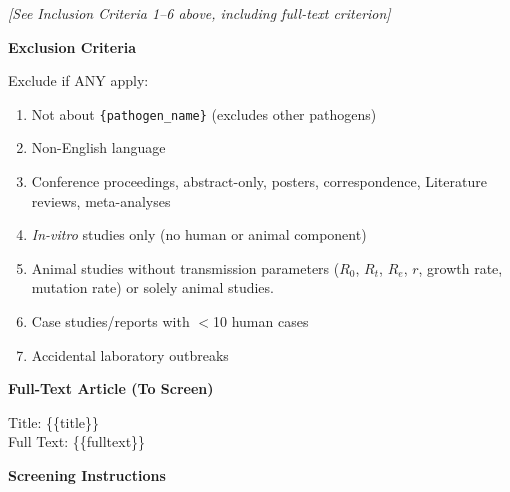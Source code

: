 \begin{tcolorbox}
\begin{tcolorbox}[
    enhanced,
    colback=gray!5,
    colframe=gray!20,
    boxrule=0pt,
    leftrule=3pt,
    arc=0pt,
    left=6pt, right=6pt, top=4pt, bottom=4pt
]
\begin{tcolorbox}[
    enhanced,
    colback=green!5,
    colframe=green!20,
    boxrule=0pt,
    leftrule=3pt,
    arc=0pt,
    left=6pt, right=6pt, top=4pt, bottom=4pt
]
\vspace{2pt}
{\small\textit{[See Inclusion Criteria 1--6 above, including full-text criterion]}}
\end{tcolorbox}

\begin{tcolorbox}[
    enhanced,
    colback=red!5,
    colframe=red!20,
    boxrule=0pt,
    leftrule=3pt,
    arc=0pt,
    left=6pt, right=6pt, top=4pt, bottom=4pt
]
{\small\textbf{\textcolor{red!60!black}{Exclusion Criteria}} 

{Exclude if ANY apply:}

\vspace{2pt}
{\small
\begin{enumerate}
[leftmargin=*, itemsep=0pt, topsep=4pt]
    \item Not about \texttt{\{pathogen\_name\}} (excludes other pathogens)
    \item Non-English language
    \item Conference proceedings, abstract-only, posters, correspondence, Literature reviews, meta-analyses
    \item \textit{In-vitro} studies only (no human or animal component)
    \item Animal studies without transmission parameters ($R_0$, $R_t$, $R_e$, $r$, growth rate, mutation rate) or solely animal studies.
\item{\parbox{0.88\linewidth}{Case studies/reports with $<$10 human cases}}
    \item Accidental laboratory outbreaks
\end{enumerate}
}}
\end{tcolorbox}
\end{tcolorbox}

\begin{tcolorbox}[
    enhanced,
    colback=gray!5,
    colframe=gray!20,
    boxrule=0pt,
    leftrule=3pt,
    arc=0pt,
    left=6pt, right=6pt, top=4pt, bottom=4pt
]
{\small\textbf{\textcolor{gray!70!black}{Full-Text Article (To Screen)}}}

\vspace{4pt}
{\small\ttfamily
Title: \{\{title\}\}\\[2pt]
Full Text: \{\{fulltext\}\}
}
\end{tcolorbox}

\begin{tcolorbox}[
    enhanced,
    colback=gray!5,
    colframe=gray!20,
    boxrule=0pt,
    leftrule=3pt,
    arc=0pt,
    left=6pt, right=6pt, top=4pt, bottom=4pt
]
{\small\textbf{\textcolor{gray!70!black}{Screening Instructions}}}


\end{tcolorbox}
\end{tcolorbox}
